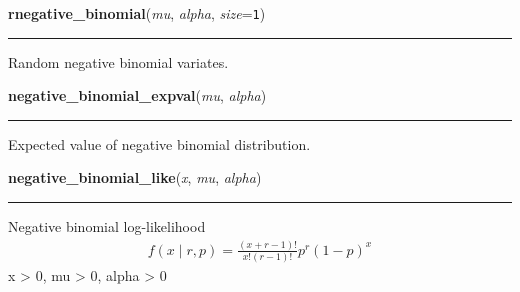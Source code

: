     \label{pymc:distributions:rnegative_binomial}

    \vspace{0.5ex}

    \begin{boxedminipage}{\textwidth}

    \raggedright \textbf{rnegative\_binomial}(\textit{mu}, \textit{alpha}, \textit{size}=\texttt{1})

    \vspace{-1.5ex}

    \rule{\textwidth}{0.5\fboxrule}

Random negative binomial variates.
    \vspace{1ex}

    \end{boxedminipage}

    \label{pymc:distributions:negative_binomial_expval}

    \vspace{0.5ex}

    \begin{boxedminipage}{\textwidth}

    \raggedright \textbf{negative\_binomial\_expval}(\textit{mu}, \textit{alpha})

    \vspace{-1.5ex}

    \rule{\textwidth}{0.5\fboxrule}

Expected value of negative binomial distribution.
    \vspace{1ex}

    \end{boxedminipage}

    \label{pymc:distributions:negative_binomial_like}

    \vspace{0.5ex}

    \begin{boxedminipage}{\textwidth}

    \raggedright \textbf{negative\_binomial\_like}(\textit{x}, \textit{mu}, \textit{alpha})

    \vspace{-1.5ex}

    \rule{\textwidth}{0.5\fboxrule}

Negative binomial log-likelihood
\begin{equation*}\begin{split}f(x \mid r, p) = \frac{(x+r-1)!}{x! (r-1)!} p^r (1-p)^x\end{split}\end{equation*}
x {\textgreater} 0, mu {\textgreater} 0, alpha {\textgreater} 0
    \vspace{1ex}

    \end{boxedminipage}

